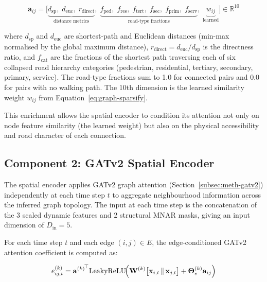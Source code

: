 \begin{equation}
    \mathbf{a}_{ij} = \bigl[\underbrace{d_{\text{sp}},\; d_{\text{euc}},\; r_{\text{direct}}}_{\text{distance metrics}},\; \underbrace{f_{\text{ped}},\; f_{\text{res}},\; f_{\text{tert}},\; f_{\text{sec}},\; f_{\text{prim}},\; f_{\text{serv}}}_{\text{road-type fractions}},\; \underbrace{w_{ij}}_{\text{learned}}\bigr] \in \mathbb{R}^{10}
    \label{eq:edge-attr}
\end{equation}

\noindent where $d_{\text{sp}}$ and $d_{\text{euc}}$ are shortest-path and Euclidean distances (min-max normalised by the global maximum distance), $r_{\text{direct}} = d_{\text{euc}} / d_{\text{sp}}$ is the directness ratio, and $f_{\text{cat}}$ are the fractions of the shortest path traversing each of six collapsed road hierarchy categories (pedestrian, residential, tertiary, secondary, primary, service). The road-type fractions sum to 1.0 for connected pairs and 0.0 for pairs with no walking path. The 10th dimension is the learned similarity weight $w_{ij}$ from Equation~\ref{eq:graph-sparsify}.

This enrichment allows the spatial encoder to condition its attention not only on node feature similarity (the learned weight) but also on the physical accessibility and road character of each connection.

\subsection{Component 2: GATv2 Spatial Encoder}
\label{subsec:meth-spatial-encoder}

The spatial encoder applies GATv2 graph attention (Section~\ref{subsec:meth-gatv2}) independently at each time step $t$ to aggregate neighbourhood information across the inferred graph topology. The input at each time step is the concatenation of the 3 scaled dynamic features and 2 structural MNAR masks, giving an input dimension of $D_{\text{in}} = 5$.

For each time step $t$ and each edge $(i, j) \in E$, the edge-conditioned GATv2 attention coefficient is computed as:

\begin{equation}
    e^{(k)}_{ij,t} = {\mathbf{a}^{(k)}}^{\!\top} \text{LeakyReLU}\!\Bigl(\mathbf{W}^{(k)} \bigl[\mathbf{x}_{i,t} \,\|\, \mathbf{x}_{j,t}\bigr] + \boldsymbol{\Theta}_e^{(k)} \mathbf{a}_{ij}\Bigr)
    \label{eq:gatv2-edge-conditioned}
\end{equation}

